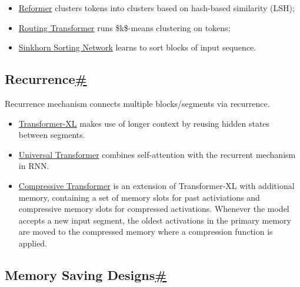 \begin{enumerate}
  \begin{itemize}
  \tightlist
  \item
    \href{https://lilianweng.github.io/posts/2023-01-27-the-transformer-family-v2/\#content-based-attention}{Reformer} clusters tokens into clusters based on hash-based similarity (LSH);
  \item
    \href{https://lilianweng.github.io/posts/2023-01-27-the-transformer-family-v2/\#content-based-attention}{Routing Transformer} runs \$k\$-means clustering on tokens;
  \item
    \href{https://arxiv.org/abs/2002.11296}{Sinkhorn Sorting Network} learns to sort blocks of input sequence.
  \end{itemize}
\end{enumerate}

\subsection{\texorpdfstring{Recurrence\hyperref[recurrence]{\#}}{Recurrence\#}}\label{recurrence}

Recurrence mechanism connects multiple blocks/segments via recurrence.

\begin{itemize}
\tightlist
\item
  \href{https://lilianweng.github.io/posts/2023-01-27-the-transformer-family-v2/\#context-memory}{Transformer-XL} makes use of longer context by reusing hidden states between segments.
\item
  \href{https://lilianweng.github.io/posts/2023-01-27-the-transformer-family-v2/\#make-it-recurrent}{Universal Transformer} combines self-attention with the recurrent mechanism in RNN.
\item
  \href{https://lilianweng.github.io/posts/2023-01-27-the-transformer-family-v2/\#context-memory}{Compressive Transformer} is an extension of Transformer-XL with additional memory, containing a set of memory slots for past activiations and compressive memory slots for compressed activations. Whenever the model accepts a new input segment, the oldest activations in the primary memory are moved to the compressed memory where a compression function is applied.
\end{itemize}

\subsection{\texorpdfstring{Memory Saving Designs\hyperref[memory-saving-designs]{\#}}{Memory Saving Designs\#}}\label{memory-saving-designs}

